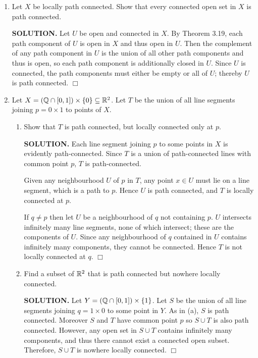 \documentclass{article}
\begin{document}
\begin{enumerate}
    \item Let $X$ be locally path connected. Show that every connected open set in $X$ is path connected.

    {\bf SOLUTION.} Let $U$ be open and connected in $X$. By Theorem 3.19, each path component of $U$ is open in $X$ and thus open in $U$. Then the complement of any path component in $U$ is the union of all other path components and thus is open, so each path component is additionally closed in $U$. Since $U$ is connected, the path components must either be empty or all of $U$; thereby $U$ is path connected. $\Box$

    \item Let $X = (\mathbb{Q} \cap [0, 1]) \times \{0\} \subseteq \mathbb{R}^2$. Let $T$ be the union of all line segments joining $p = 0 \times 1$ to points of $X$.

    \begin{enumerate}
        \item Show that $T$ is path connected, but locally connected only at $p$.

        {\bf SOLUTION.} Each line segment joining $p$ to some points in $X$ is evidently path-connected. Since $T$ is a union of path-connected lines with common point $p$, $T$ is path-connected.

        Given any neighbourhood $U$ of $p$ in $T$, any point $x \in U$ must lie on a line segment, which is a path to $p$. Hence $U$ is path connected, and $T$ is locally connected at $p$.

        If $q \neq p$ then let $U$ be a neighbourhood of $q$ not containing $p$. $U$ intersects infinitely many line segments, none of which intersect; these are the components of $U$. Since any neighbourhood of $q$ contained in $U$ contains infinitely many components, they cannot be connected. Hence $T$ is not locally connected at $q$. $\Box$

        \item Find a subset of $\mathbb{R}^2$ that is path connected but nowhere locally connected.

        {\bf SOLUTION.} Let $Y = (\mathbb{Q} \cap [0, 1]) \times \{1\}$. Let $S$ be the union of all line segments joining $q = 1 \times 0$ to some point in $Y$. As in (a), $S$ is path connected. Moreover $S$ and $T$ have common point $p$ so $S \cup T$ is also path connected. However, any open set in $S \cup T$ contains infinitely many components, and thus there cannot exist a connected open subset. Therefore, $S \cup T$ is nowhere locally connected. $\Box$
    \end{enumerate}


\end{enumerate}
\end{document}
